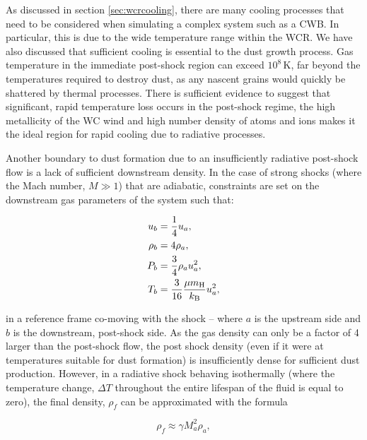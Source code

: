 As discussed in section \ref{sec:wcrcooling}, there are many cooling processes that need to be considered when simulating a complex system such as a CWB.
In particular, this is due to the wide temperature range within the WCR.
We have also discussed that sufficient cooling is essential to the dust growth process.
Gas temperature in the immediate post-shock region can exceed $10^8\, \si{\kelvin}$, far beyond the temperatures required to destroy dust, as any nascent grains would quickly be shattered by thermal processes.
There is sufficient evidence to suggest that significant, rapid temperature loss occurs in the post-shock regime, the high metallicity of the WC wind and high number density of atoms and ions makes it the ideal region for rapid cooling due to radiative processes.

Another boundary to dust formation due to an insufficiently radiative post-shock flow is a lack of sufficient downstream density.
In the case of strong shocks (where the Mach number, $M \gg 1$) that are adiabatic, constraints are set on the downstream gas parameters of the system such that:

\begin{subequations}
  \begin{align}
    u_b    & = \frac{1}{4} u_a , \\
    \rho_b & = 4 \rho_a , \\ 
    P_b    & = \frac{3}{4} \rho_a u_a^2 , \\
    T_b    & = \frac{3}{16} \frac{\mu m_\text{H}}{k_\text{B}} u_a^2 ,
  \end{align}
\end{subequations}

\noindent
in a reference frame co-moving with the shock -- where $a$ is the upstream side and $b$ is the downstream, post-shock side.
As the gas density can only be a factor of 4 larger than the post-shock flow, the post shock density (even if it were at  temperatures suitable for dust formation) is insufficiently dense for sufficient dust production.
However, in a radiative shock behaving isothermally (where the temperature change, $\Delta T$ throughout the entire lifespan of the fluid is equal to zero), the final density, $\rho_f$ can be approximated with the formula

\begin{equation}
  \rho_f \approx \gamma M_a^2 \rho_a,
\end{equation}

